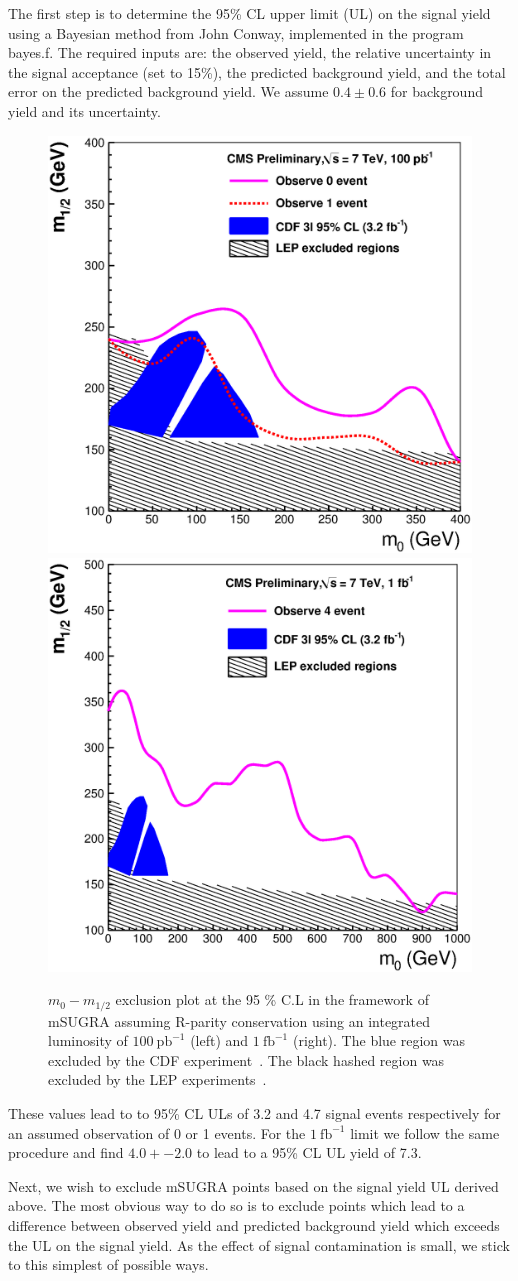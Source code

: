 The first  step is to  determine the 95\%  CL upper limit (UL)  on the
signal yield using a Bayesian  method from John Conway, implemented in
the program bayes.f. The required  inputs are: the observed yield, the
relative  uncertainty in  the  signal acceptance  (set  to 15\%),  the
predicted  background yield,  and  the total  error  on the  predicted
background yield. We assume $0.4 \pm 0.6$ for background yield and 
its uncertainty.
\vspace{3 mm}
\begin{figure}[htb]
\begin{center}

\includegraphics[width=0.485\linewidth]{figs/exclusion100ss.eps}
\includegraphics[width=0.485\linewidth]{figs/exclusion1fbss.eps}
\caption{ $m_{0}-m_{1/2}$ exclusion plot at the 95 \% C.L in the framework of 
mSUGRA assuming R-parity conservation using an  integrated  luminosity of  
$100~\mathrm{pb}^{-1}$ (left) and $1~\mathrm{fb}^{-1}$ (right). The blue region
was excluded by the CDF experiment~\cite{cdf:recentSusy}. The black hashed region was excluded
by the LEP experiments~\cite{lep:lepsusyreach}.\label{fig:ss_exclusion}}

\end{center}
\end{figure}

These values lead to 
to  95\% CL  ULs  of 3.2 and 4.7  signal  events respectively for an assumed 
observation of 0 or 1 events. For the $1~\mathrm{fb}^{-1}$ limit we follow the same procedure
and find $4.0+-2.0$ to lead to a 95\% CL UL yield of 7.3.

Next, we  wish to exclude mSUGRA  points based on the  signal yield UL
derived above.   The most obvious  way to do  so is to  exclude points
which  lead  to a  difference  between  observed  yield and  predicted
background yield  which exceeds the  UL on the signal  yield. 
As the effect of signal contamination is small, we stick to this simplest 
of possible ways.

